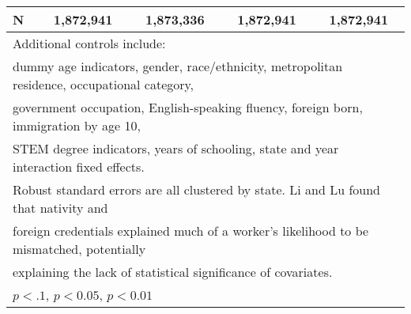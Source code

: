 \begin{table}[htbp]
\begin{tabular}{l*{4}{c}}
N                   &   1,872,941         &   1,873,336         &   1,872,941         &   1,872,941         \\
\bottomrule
\multicolumn{5}{l}{\footnotesize Additional controls include:}\\
\multicolumn{5}{l}{\footnotesize dummy age indicators, gender, race/ethnicity, metropolitan residence, occupational category,}\\
\multicolumn{5}{l}{\footnotesize government occupation, English-speaking fluency, foreign born, immigration by age 10,}\\
\multicolumn{5}{l}{\footnotesize STEM degree indicators, years of schooling, state and year interaction fixed effects.}\\
\multicolumn{5}{l}{\footnotesize Robust standard errors are all clustered by state. Li and Lu found that nativity and}\\
\multicolumn{5}{l}{\footnotesize foreign credentials explained much of a worker's likelihood to be mismatched, potentially}\\
\multicolumn{5}{l}{\footnotesize explaining the lack of statistical significance of covariates.}\\
\multicolumn{5}{l}{\footnotesize \sym{*} \(p<.1\), \sym{**} \(p<0.05\), \sym{***} \(p<0.01\)}\\
\end{tabular}
\end{table}
